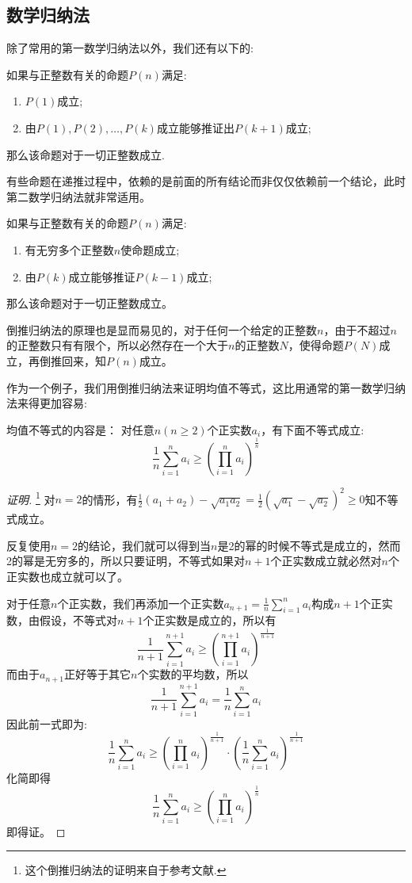 \subsection{数学归纳法}
\label{subsec:mathematical-induction}

除了常用的第一数学归纳法以外，我们还有以下的:
\begin{principle}[第二数学归纳法]
如果与正整数有关的命题$P(n)$满足:
  \begin{enumerate}
  \item $P(1)$成立;
  \item 由$P(1),P(2),\dots,P(k)$成立能够推证出$P(k+1)$成立;
  \end{enumerate}
那么该命题对于一切正整数成立.
\end{principle}
有些命题在递推过程中，依赖的是前面的所有结论而非仅仅依赖前一个结论，此时第二数学归纳法就非常适用。
\begin{principle}[倒推归纳法]
如果与正整数有关的命题$P(n)$满足:
  \begin{enumerate}
  \item 有无穷多个正整数$n$使命题成立;
  \item 由$P(k)$成立能够推证$P(k-1)$成立;
  \end{enumerate}
那么该命题对于一切正整数成立。
\end{principle}
倒推归纳法的原理也是显而易见的，对于任何一个给定的正整数$n$，由于不超过$n$的正整数只有有限个，所以必然存在一个大于$n$的正整数$N$，使得命题$P(N)$成立，再倒推回来，知$P(n)$成立。

\begin{example}[均值不等式]
作为一个例子，我们用倒推归纳法来证明均值不等式，这比用通常的第一数学归纳法来得更加容易:

  均值不等式的内容是： 对任意$n(n\geqslant2)$个正实数$a_i$，有下面不等式成立:
\[ \frac{1}{n}\sum_{i=1}^na_i \geqslant \left( \prod_{i=1}^na_i \right)^{\frac{1}{n}} \]

\begin{proof}[证明]\footnote{这个倒推归纳法的证明来自于参考文献\cite{the-secret-of-inequality}.}
  对$n=2$的情形，有$\frac{1}{2}(a_1+a_2)-\sqrt{a_1a_2}=\frac{1}{2}(\sqrt{a_1}-\sqrt{a_2})^2\geqslant 0$知不等式成立。

 反复使用$n=2$的结论，我们就可以得到当$n$是2的幂的时候不等式是成立的，然而2的幂是无穷多的，所以只要证明，不等式如果对$n+1$个正实数成立就必然对$n$个正实数也成立就可以了。

对于任意$n$个正实数，我们再添加一个正实数$a_{n+1}=\frac{1}{n}\sum_{i=1}^na_i$构成$n+1$个正实数，由假设，不等式对$n+1$个正实数是成立的，所以有
\[
\frac{1}{n+1}\sum_{i=1}^{n+1}a_i \geqslant \left( \prod_{i=1}^{n+1}a_i \right)^{\frac{1}{n+1}}
\]
而由于$a_{n+1}$正好等于其它$n$个实数的平均数，所以
\[ \frac{1}{n+1}\sum_{i=1}^{n+1}a_i = \frac{1}{n}\sum_{i=1}^{n}a_i \]
因此前一式即为:
\[
\frac{1}{n}\sum_{i=1}^{n}a_i \geqslant \left( \prod_{i=1}^{n}a_i \right)^{\frac{1}{n+1}} \cdot \left( \frac{1}{n}\sum_{i=1}^na_i \right)^{\frac{1}{n+1}}
\]
化简即得
\[
\frac{1}{n}\sum_{i=1}^na_i \geqslant \left( \prod_{i=1}^na_i \right)^{\frac{1}{n}} 
\]
即得证。
\end{proof}
\end{example}

